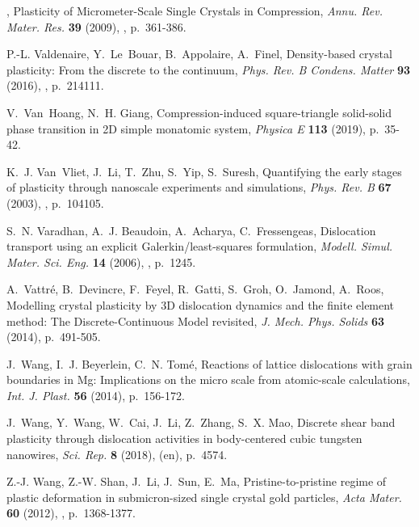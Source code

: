 \documentclass[CRPHYS,Unicode,manuscript]{cedram}
\begin{document}
\begin{thebibliography}{100}
\bysame , {\og Plasticity of {Micrometer-Scale} Single Crystals in
  Compression\fg}, \emph{Annu. Rev. Mater. Res.} \textbf{39} (2009), , p.~361-386.

P.-L. Valdenaire, Y.~Le~Bouar, B.~Appolaire, A.~Finel, {\og Density-based
  crystal plasticity: From the discrete to the continuum\fg}, \emph{Phys. Rev.
  B Condens. Matter} \textbf{93} (2016), , p.~214111.

V.~Van~Hoang, N.~H. Giang, {\og Compression-induced square-triangle solid-solid
  phase transition in {2D} simple monatomic system\fg}, \emph{Physica E}
  \textbf{113} (2019), p.~35-42.

K.~J. Van~Vliet, J.~Li, T.~Zhu, S.~Yip, S.~Suresh, {\og Quantifying the early
  stages of plasticity through nanoscale experiments and simulations\fg},
  \emph{Phys. Rev. B} \textbf{67} (2003), , p.~104105.

S.~N. Varadhan, A.~J. Beaudoin, A.~Acharya, C.~Fressengeas, {\og Dislocation
  transport using an explicit Galerkin/least-squares formulation\fg},
  \emph{Modell. Simul. Mater. Sci. Eng.} \textbf{14} (2006), ,
  p.~1245.

A.~Vattr{\'e}, B.~Devincre, F.~Feyel, R.~Gatti, S.~Groh, O.~Jamond, A.~Roos,
  {\og Modelling crystal plasticity by {3D} dislocation dynamics and the finite
  element method: The {Discrete-Continuous} Model revisited\fg}, \emph{J. Mech.
  Phys. Solids} \textbf{63} (2014), p.~491-505.

J.~Wang, I.~J. Beyerlein, C.~N. Tom{\'e}, {\og Reactions of lattice
  dislocations with grain boundaries in Mg: Implications on the micro scale
  from atomic-scale calculations\fg}, \emph{Int. J. Plast.} \textbf{56} (2014),
  p.~156-172.

J.~Wang, Y.~Wang, W.~Cai, J.~Li, Z.~Zhang, S.~X. Mao, {\og Discrete shear band
  plasticity through dislocation activities in body-centered cubic tungsten
  nanowires\fg}, \emph{Sci. Rep.} \textbf{8} (2018),  (en),
  p.~4574.

Z.-J. Wang, Z.-W. Shan, J.~Li, J.~Sun, E.~Ma, {\og Pristine-to-pristine regime
  of plastic deformation in submicron-sized single crystal gold particles\fg},
  \emph{Acta Mater.} \textbf{60} (2012), , p.~1368-1377.


\end{thebibliography}
\end{document}
